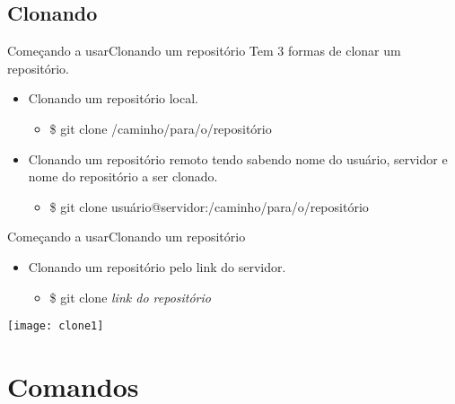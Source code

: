 \documentclass[10pt]{beamer}
\begin{document}
\subsection{Clonando}
\begin{frame}{Começando a usar}{Clonando um repositório}
	Tem 3 formas de clonar um repositório.
	\begin{itemize}
		\item Clonando um repositório local.
		\begin{itemize}
			\item \$ git clone /caminho/para/o/repositório		
		\end{itemize}
		\item Clonando um repositório remoto tendo sabendo nome do usuário, servidor e
				nome do repositório a ser clonado.
		\begin{itemize}
			\item \$ git clone usuário@servidor:/caminho/para/o/repositório		
		\end{itemize}
	\end{itemize}
\end{frame}
\begin{frame}{Começando a usar}{Clonando um repositório}
	\begin{itemize}
	\item Clonando um repositório pelo link do servidor.
	\begin{itemize}
		\item \$ git clone \textit{link do repositório}
	\end{itemize}
	\end{itemize}
	\texttt{[image: clone1]}\\
	
\end{frame}



\section{Comandos}
\end{document}
